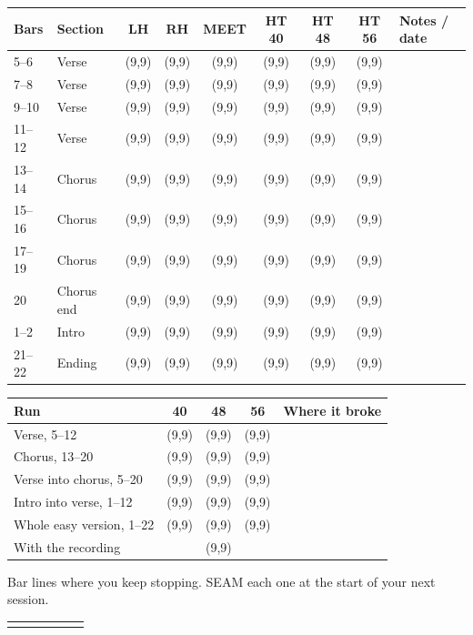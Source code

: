 \documentclass[10pt]{article}
\newcommand{\sect}[1]{\par\vspace{5pt}{\large\bfseries #1}\par\vspace{2pt}}
\begin{document}
\sect{Bar groups}
\small
\renewcommand{\arraystretch}{1.6}
\newcommand{\bx}{\framebox(9,9){}}
\begin{tabularx}{\textwidth}{|l|l|c|c|c|c|c|c|X|}
\hline
\textbf{Bars} & \textbf{Section} & \textbf{LH} & \textbf{RH} & \textbf{MEET} & \textbf{HT 40} & \textbf{HT 48} & \textbf{HT 56} & \textbf{Notes / date}\\\hline
5--6 & Verse & \bx & \bx & \bx & \bx & \bx & \bx & \\\hline
7--8 & Verse & \bx & \bx & \bx & \bx & \bx & \bx & \\\hline
9--10 & Verse & \bx & \bx & \bx & \bx & \bx & \bx & \\\hline
11--12 & Verse & \bx & \bx & \bx & \bx & \bx & \bx & \\\hline
13--14 & Chorus & \bx & \bx & \bx & \bx & \bx & \bx & \\\hline
15--16 & Chorus & \bx & \bx & \bx & \bx & \bx & \bx & \\\hline
17--19 & Chorus & \bx & \bx & \bx & \bx & \bx & \bx & \\\hline
20 & Chorus end & \bx & \bx & \bx & \bx & \bx & \bx & \\\hline
1--2 & Intro & \bx & \bx & \bx & \bx & \bx & \bx & \\\hline
21--22 & Ending & \bx & \bx & \bx & \bx & \bx & \bx & \\\hline
\end{tabularx}\normalsize

\sect{Joins}
\small
\renewcommand{\arraystretch}{1.6}
\begin{tabularx}{\textwidth}{|l|c|c|c|X|}
\hline
\textbf{Run} & \textbf{40} & \textbf{48} & \textbf{56} & \textbf{Where it broke}\\\hline
Verse, 5--12 & \bx & \bx & \bx & \\\hline
Chorus, 13--20 & \bx & \bx & \bx & \\\hline
Verse into chorus, 5--20 & \bx & \bx & \bx & \\\hline
Intro into verse, 1--12 & \bx & \bx & \bx & \\\hline
Whole easy version, 1--22 & \bx & \bx & \bx & \\\hline
With the recording & \multicolumn{3}{c|}{\bx} & \\\hline
\end{tabularx}\normalsize

\sect{Seam list}
Bar lines where you keep stopping. SEAM each one at the start of your next session.\par\vspace{4pt}
\renewcommand{\arraystretch}{1.8}
\begin{tabularx}{\textwidth}{|X|X|X|X|X|X|}
\hline
&&&&&\\\hline
&&&&&\\\hline
\end{tabularx}
\end{document}
